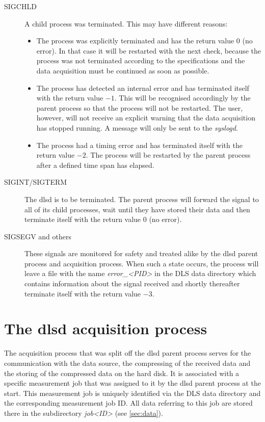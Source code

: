 \documentclass[a4paper,12pt,BCOR6mm,bibtotoc,idxtotoc]{scrbook}
\begin{document}
\begin{description}
\item[SIGCHLD] A child process was terminated. This may have different reasons: \begin{itemize}
\item The process was explicitly terminated and has the return value 0 (no error). In that case it will be restarted with the next check, because the process was not terminated according to the specifications and the data acquisition must be continued as soon as possible.
\item The process has detected an internal error and has terminated itself with the return value $-1$. This will be recognised accordingly by the parent process so that the process will not be restarted. The user, however, will not receive an explicit warning that the data acquisition has stopped running. A message will only be sent to the \textit{syslogd}.
\item The process had a timing error and has terminated itself with the return  value $-2$. The process will be restarted by the parent process after a defined time span has elapsed. \end{itemize}
\item[SIGINT/SIGTERM] The dlsd is to be terminated. The parent process will forward the signal to all of its child processes, wait until they have stored their data and then terminate itself with the return value 0 (no error).
\item[SIGSEGV and others] These signals are monitored for safety and treated alike by the dlsd parent process and acquisition process. When such a state occurs, the process will leave a file with the name \textit{error\_\textless PID\textgreater} in the DLS data directory which contains information about the signal received and shortly thereafter terminate itself with the return value $-3$. \end{description}


\section{The dlsd acquisition process}
\label{sec:dlsd_logger}

The acquisition process that was split off the dlsd parent process serves for
the communication with the data source, the compressing of the received data
and the storing of the compressed data on the hard disk. It is associated with
a specific measurement job that was assigned to it by
the dlsd parent process at the start. This measurement job is uniquely
identified via the DLS data directory and the corresponding measurement job
ID. All data referring to this job are stored there in the subdirectory
\textit{job\textless ID\textgreater} (see \autoref{sec:data}).
\end{document}

